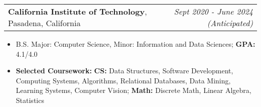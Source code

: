 \documentclass[letterpaper,11pt]{article}
\makeatletter
\newcommand{\resitem}[1]{\item[--] #1}
\newcommand{\edusubheading}[3]{
	\begin{tabular*}{7.5in}{l@{\extracolsep{\fill}}r}
		\textbf{#1}, #2 & \textit{#3} \\
	\end{tabular*}
	}
\makeatother
\begin{document}

\edusubheading{California Institute of Technology}
			  {Pasadena, California}
			  {Sept 2020 - June 2024 (Anticipated)}
\begin{itemize}
	\resitem{
		B.S. Major: Computer Science,
		Minor: Information and Data Sciences;
		\textbf{GPA:} 4.1/4.0
	}
	\resitem{
		\textbf{Selected Coursework:}
			\textbf{CS:}
				Data Structures,
				Software Development,
				Computing Systems,
				Algorithms,
				Relational Databases,
				Data Mining,
				Learning Systems,
				Computer Vision;
			\textbf{Math:}
				Discrete Math,
				Linear Algebra,
				Statistics
	}
\end{itemize}

\end{document}
